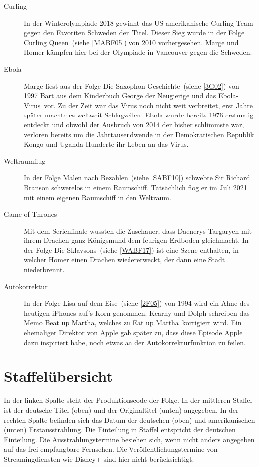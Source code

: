 \begin{appendix}
\begin{description}
  \item[Curling] In der Winterolympiade 2018 gewinnt das US-amerikanische Curling-Team gegen den Favoriten Schweden den Titel. Dieser Sieg wurde in der Folge \glqq Curling Queen\grqq\ (siehe \ref{MABF05}) von 2010 vorhergesehen. Marge und Homer kämpfen hier bei der Olympiade in Vancouver gegen die Schweden.
  \item[Ebola] Marge liest aus der Folge \glqq Die Saxophon-Geschichte\grqq\ (siehe \ref{3G02}) von 1997 Bart aus dem Kinderbuch \glqq George der Neugierige und das Ebola-Virus\grqq\ vor. Zu der Zeit war das Virus noch nicht weit verbreitet, erst Jahre später machte es weltweit Schlagzeilen. Ebola wurde bereits 1976 erstmalig entdeckt und obwohl der Ausbruch von 2014 der bisher schlimmste war, verloren bereits um die Jahrtausendwende in der Demokratischen Republik Kongo und Uganda Hunderte ihr Leben an das Virus.
  \item[Weltraumflug] In der Folge \glqq Malen nach Bezahlen\grqq\ (siehe \ref{SABF10}) schwebte Sir Richard Branson schwerelos in einem Raumschiff. Tatsächlich flog er im Juli 2021 mit einem eigenen Raumschiff in den Weltraum.
  \item[Game of Thrones] Mit dem Serienfinale wussten die Zuschauer, dass Daenerys Targaryen mit ihrem Drachen ganz Königsmund dem feurigen Erdboden gleichmacht. In der Folge \glqq Die Sklavsons\grqq\ (siehe \ref{WABF17}) ist eine Szene enthalten, in welcher Homer einen Drachen wiedererweckt, der dann eine Stadt niederbrennt.
  \item[Autokorrektur] In der Folge \glqq Lisa auf dem Eise\grqq\ (siehe \ref{2F05}) von 1994 wird ein Ahne des heutigen iPhones auf's Korn genommen. Kearny und Dolph schreiben das Memo \glqq Beat up Martha\grqq, welches zu \glqq Eat up Martha\grqq\ korrigiert wird. Ein ehemaliger Direktor von Apple gab später zu, dass diese Episode Apple dazu inspiriert habe, noch etwas an der Autokorrekturfunktion zu feilen.
\end{description}

\section{Staffelübersicht}\label{StaffelUebersicht}
In der linken Spalte steht der Produktionscode der Folge. In der mittleren Staffel ist der deutsche Titel (oben) und der Originaltitel (unten) angegeben. In der rechten Spalte befinden sich das Datum der deutschen (oben) und amerikanischen (unten) Erstausstrahlung. Die Einteilung in Staffel entspricht der deutschen Einteilung. Die Ausstrahlungstermine beziehen sich, wenn nicht anders angegeben auf das frei empfangbare Fernsehen. Die Veröffentlichungstermine von Streamingdiensten wie Disney+ sind hier nicht berücksichtigt.


\end{appendix}
